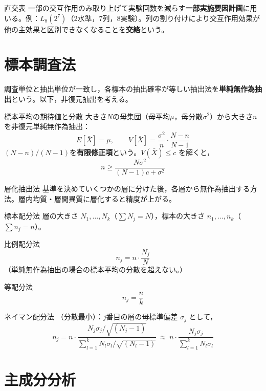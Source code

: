 \documentclass[a4paper,11pt]{ltjsarticle}
\begin{document}
\begin{term}{直交表}
一部の交互作用のみ取り上げて実験回数を減らす\textbf{一部実施要因計画}に用いる。例：$L_8(2^7)$（2水準，7列，8実験）。列の割り付けにより交互作用効果が他の主効果と区別できなくなることを\textbf{交絡}という。
\end{term}

\section{標本調査法}

調査単位と抽出単位が一致し，各標本の抽出確率が等しい抽出法を\textbf{単純無作為抽出}という。以下，非復元抽出を考える。

\begin{term}{標本平均の期待値と分散}
大きさ$N$の母集団（母平均$\mu$，母分散$\sigma^2$）から大きさ$n$を非復元単純無作為抽出：
\[
E[\bar X] = \mu, \qquad V[\bar X] = \frac{\sigma^2}{n}\cdot\frac{N-n}{N-1}
\]
$(N-n)/(N-1)$を\textbf{有限修正項}という。$V(\bar X)\le c$ を解くと，
\[
n \ge \frac{N\sigma^2}{(N-1)c+\sigma^2}
\]
\end{term}

\begin{term}{層化抽出法}
基準を決めていくつかの層に分けた後，各層から無作為抽出する方法。層内均質・層間異質に層化すると精度が上がる。
\end{term}

\begin{term}{標本配分法}
層の大きさ $N_1,\dots,N_k$（$\sum N_j=N$），標本の大きさ $n_1,\dots,n_k$（$\sum n_j=n$）。
\end{term}

\begin{term}{比例配分法}
\[
n_j = n\cdot\frac{N_j}{N}
\]
（単純無作為抽出の場合の標本平均の分散を超えない。）
\end{term}

\begin{term}{等配分法}
\[
n_j = \frac{n}{k}
\]
\end{term}

\begin{term}{ネイマン配分法}
（分散最小）：$j$番目の層の母標準偏差 $\sigma_j$ として，
\[
n_j = n\cdot\frac{N_j\sigma_j/\sqrt{(N_j-1)}}{\sum_{l=1}^k N_l\sigma_l/\sqrt{(N_l-1)}}
\ \approx\
n\cdot\frac{N_j\sigma_j}{\sum_{l=1}^k N_l\sigma_l}
\]
\end{term}

\section{主成分分析}
\end{document}
